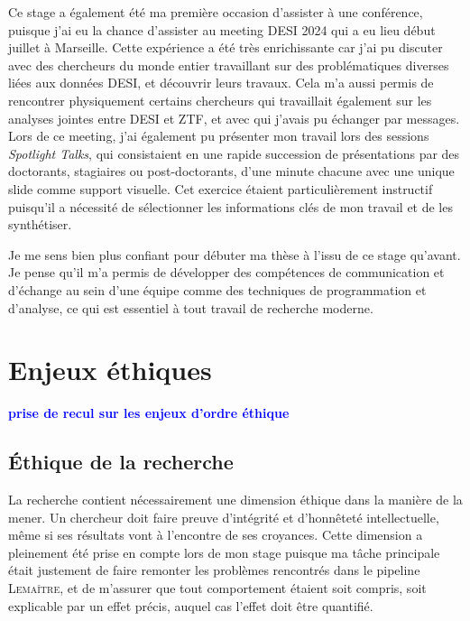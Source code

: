 \documentclass{book}
\newcommand{\consignes}[1]{{\textcolor{blue}{\bf \large #1}}}
\def\lemaitre{\textsc{Lemaître}\xspace}
\begin{document}
Ce stage a également été ma première occasion d'assister à une conférence, puisque j'ai eu la chance d'assister au meeting DESI 2024 qui a eu lieu début juillet à Marseille. Cette expérience a été très enrichissante car j'ai pu discuter avec des chercheurs du monde entier travaillant sur des problématiques diverses liées aux données DESI, et découvrir leurs travaux. Cela m'a aussi permis de rencontrer physiquement certains chercheurs qui travaillait également sur les analyses jointes entre DESI et ZTF, et avec qui j'avais pu échanger par messages. Lors de ce meeting, j'ai également pu présenter mon travail lors des sessions \textit{Spotlight Talks}, qui consistaient en une rapide succession de présentations par des doctorants, stagiaires ou post-doctorants, d'une minute chacune avec une unique slide comme support visuelle. Cet exercice étaient particulièrement instructif puisqu'il a nécessité de sélectionner les informations clés de mon travail et de les synthétiser.

Je me sens bien plus confiant pour débuter ma thèse à l'issu de ce stage qu'avant. Je pense qu'il m'a permis de développer des compétences de communication et d'échange au sein d'une équipe comme des techniques de programmation et d'analyse, ce qui est essentiel à tout travail de recherche moderne.


\chapter{Enjeux éthiques}
\consignes{prise de recul sur les enjeux d’ordre éthique}

\section{Éthique de la recherche}

La recherche contient nécessairement une dimension éthique dans la manière de la mener. Un chercheur doit faire preuve d'intégrité et d'honnêteté intellectuelle, même si ses résultats vont à l'encontre de ses croyances. Cette dimension a pleinement été prise en compte lors de mon stage puisque ma tâche principale était justement de faire remonter les problèmes rencontrés dans le pipeline \lemaitre, et de m'assurer que tout comportement étaient soit compris, soit explicable par un effet précis, auquel cas l'effet doit être quantifié.
\end{document}
